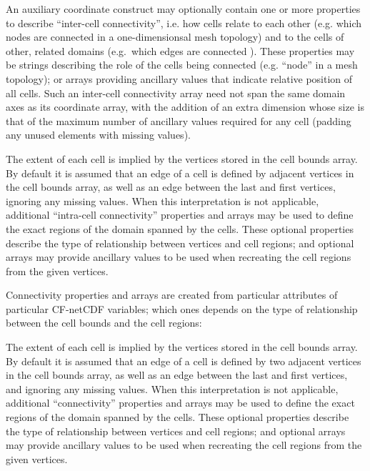 
An auxiliary coordinate construct may optionally contain one or more
properties to describe ``inter-cell connectivity'', i.e. how cells
relate to each other (e.g. which nodes are connected in a
one-dimensionsal mesh topology) and to the cells of other, related
domains (e.g.\ which edges are connected ). These properties may be
strings describing the role of the cells being connected
(e.g. ``node'' in a mesh topology); or arrays providing ancillary
values that indicate relative position of all cells. Such an
inter-cell connectivity array need not span the same domain axes as
its coordinate array, with the addition of an extra dimension whose
size is that of the maximum number of ancillary values required for
any cell (padding any unused elements with missing values).




The extent of each cell is implied by the vertices stored in the cell
bounds array. By default it is assumed that an edge of a cell is
defined by adjacent vertices in the cell bounds array, as well as an
edge between the last and first vertices, ignoring any missing
values. When this interpretation is not applicable, additional
``intra-cell connectivity'' properties and arrays may be used to
define the exact regions of the domain spanned by the cells. These
optional properties describe the type of relationship between vertices
and cell regions; and optional arrays may provide ancillary values to
be used when recreating the cell regions from the given vertices.

Connectivity properties and arrays are created from particular
attributes of particular CF-netCDF variables; which ones depends on
the type of relationship between the cell bounds and the cell regions:


The extent of each cell is implied by the vertices stored in the cell
bounds array. By default it is assumed that an edge of a cell is
defined by two adjacent vertices in the cell bounds array, as well as
an edge between the last and first vertices, and ignoring any missing
values. When this interpretation is not applicable, additional
``connectivity'' properties and arrays may be used to define the exact
regions of the domain spanned by the cells. These optional properties
describe the type of relationship between vertices and cell regions;
and optional arrays may provide ancillary values to be used when
recreating the cell regions from the given vertices.

